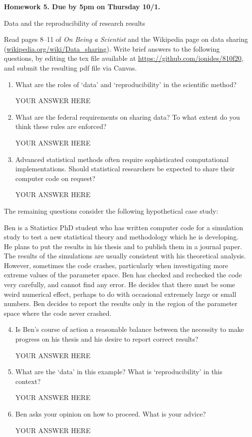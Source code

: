 \documentclass[12pt]{article}
\begin{document}
\begin{center}\bf
Homework 5. Due by 5pm on Thursday 10/1.

Data and the reproducibility of research results
\end{center}
Read pages 8--11 of {\em On Being a Scientist} and the Wikipedia page on data sharing (\url{wikipedia.org/wiki/Data_sharing}). Write brief answers to the following questions, by editing the tex file available at \url{https://github.com/ionides/810f20}, and submit the resulting pdf file via Canvas.

\begin{enumerate}

\item What are the roles of `data' and `reproducibility' in the scientific method? 

YOUR ANSWER HERE

\item What are the federal requirements on sharing data? To what extent do you think these rules are enforced?

YOUR ANSWER HERE

\item Advanced statistical methods often require sophisticated computational implementations. Should statistical researchers be expected to share their computer code on request?

YOUR ANSWER HERE

\end{enumerate}
The remaining questions consider the following hypothetical case study:

Ben is a Statistics PhD student who has written computer code for a simulation study to test a new statistical theory and methodology which he is developing.
He plans to put the results in his thesis and to publish them in a journal paper.
The results of the simulations are usually consistent with his theoretical analysis. 
However, sometimes the code crashes, particularly when investigating more extreme values of the parameter space.
Ben has checked and rechecked the code very carefully, and cannot find any error.
He decides that there must be some weird numerical effect, perhaps to do with occasional extremely large or small numbers.
Ben decides to report the results only in the region of the parameter space where the code never crashed. 
\begin{enumerate}\setcounter{enumi}{3}
\item Is Ben's course of action a reasonable balance between the necessity to make progress on his thesis and his desire to report correct results? 

YOUR ANSWER HERE

\item What are the `data' in this example? What is `reproducibility' in this context?

YOUR ANSWER HERE

\item Ben asks your opinion on how to proceed. What is your advice?

YOUR ANSWER HERE
\end{enumerate}
\end{document}
